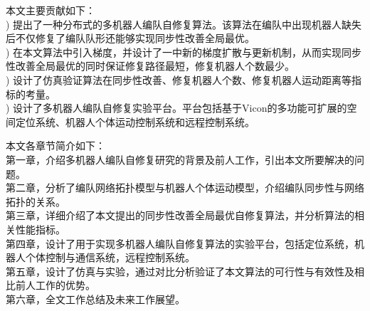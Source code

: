 本文主要贡献如下：\\
) 提出了一种分布式的多机器人编队自修复算法。该算法在编队中出现机器人缺失后不仅修复了编队队形还能够实现同步性改善全局最优。\\
) 在本文算法中引入梯度，并设计了一中新的梯度扩散与更新机制，从而实现同步性改善全局最优的同时保证修复路径最短，修复机器人个数最少。\\
) 设计了仿真验证算法在同步性改善、修复机器人个数、修复机器人运动距离等指标的考量。\\
) 设计了多机器人编队自修复实验平台。平台包括基于Vicon的多功能可扩展的空间定位系统、机器人个体运动控制系统和远程控制系统。

本文各章节简介如下：\\
\indent 第一章，介绍多机器人编队自修复研究的背景及前人工作，引出本文所要解决的问题。\\
\indent 第二章，分析了编队网络拓扑模型与机器人个体运动模型，介绍编队同步性与网络拓扑的关系。\\
\indent 第三章，详细介绍了本文提出的同步性改善全局最优自修复算法，并分析算法的相关性能指标。\\
\indent 第四章，设计了用于实现多机器人编队自修复算法的实验平台，包括定位系统，机器人个体控制与通信系统，远程控制系统。\\
\indent 第五章，设计了仿真与实验，通过对比分析验证了本文算法的可行性与有效性及相比前人工作的优势。\\
\indent 第六章，全文工作总结及未来工作展望。

